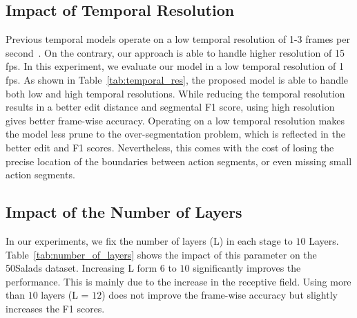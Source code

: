 \documentclass[10pt,twocolumn,letterpaper]{article}
\begin{document}
\subsection{Impact of Temporal Resolution}

Previous temporal models operate on a low temporal resolution of 1-3 frames 
per second~\cite{Lea_2017_CVPR, lei2018temporal, ding2018weakly}. On the 
contrary, our approach is able to handle higher resolution of 15 fps. 
In this experiment, we evaluate our model in a low temporal resolution of 
1 fps. As shown in Table~\ref{tab:temporal_res}, the proposed model is able 
to handle both low and high temporal resolutions. While reducing the 
temporal resolution results in a better edit distance and segmental F1 score, 
using high resolution gives better frame-wise accuracy. Operating on a low 
temporal resolution makes the model less prune to the over-segmentation problem, 
which is reflected in the better edit and F1 scores. Nevertheless, this comes 
with the cost of losing the precise location of the boundaries between action 
segments, or even missing small action segments.

\begin{table}[tb]
\centering
{}
\caption{Impact of temporal resolution on the 50Salads dataset.}
\label{tab:temporal_res}
\end{table}



\subsection{Impact of the Number of Layers}
In our experiments, we fix the number of layers (L) in each stage to $10$ Layers. 
Table~\ref{tab:number_of_layers} shows the impact of this parameter on 
the 50Salads dataset. Increasing L form $6$ to $10$ significantly 
improves the performance. This is mainly due to the increase in the 
receptive field. Using more than $10$ layers (L = $12$) does not improve 
the frame-wise accuracy but slightly increases the F1 scores.
\end{document}
